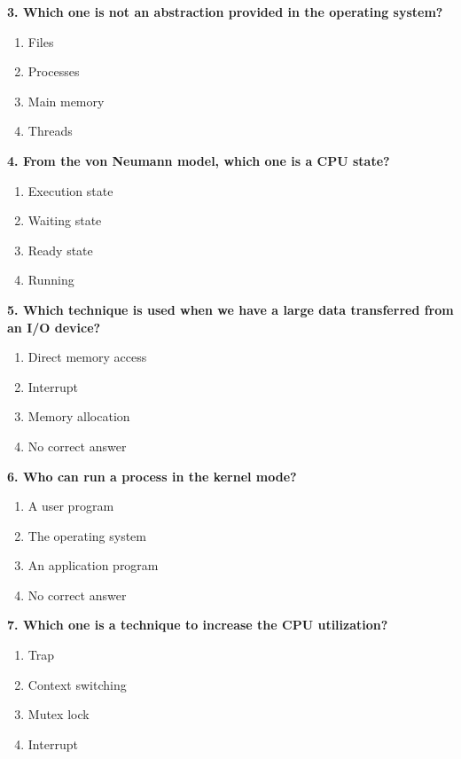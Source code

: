 \documentclass[12pt]{article}
\begin{document}
\noindent \textbf{3. Which one is not an abstraction provided in the operating system?}
\begin{enumerate}[label=\alph*)]
    \item Files
    \item Processes
    \item Main memory
    \item Threads
\end{enumerate} \vspace{15pt}
\newpage
\noindent \textbf{4. From the von Neumann model, which one is a CPU state?}
\begin{enumerate}[label=\alph*)]
    \item Execution state
    \item Waiting state
    \item Ready state
    \item Running
\end{enumerate} \vspace{15pt}

\noindent \textbf{5. Which technique is used when we have a large data transferred from an I/O device?}
\begin{enumerate}[label=\alph*)]
    \item Direct memory access
    \item Interrupt
    \item Memory allocation
    \item No correct answer
\end{enumerate} \vspace{15pt}

\noindent \textbf{6. Who can run a process in the kernel mode?}
\begin{enumerate}[label=\alph*)]
    \item A user program
\item The operating system
\item An application program
\item No correct answer
\end{enumerate} \vspace{15pt}
\noindent \textbf{7. Which one is a technique to increase the CPU utilization?}
\begin{enumerate}[label=\alph*)]
    \item Trap
    \item Context switching
    \item Mutex lock
    \item Interrupt
\end{enumerate} \vspace{15pt}
\end{document}
